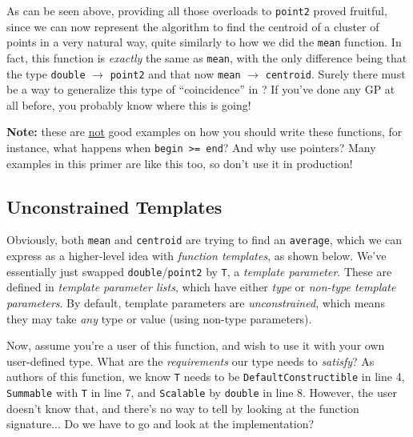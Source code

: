 



\noindent As can be seen above, providing all those overloads to \texttt{point2} proved fruitful, since we can now represent the algorithm to find the centroid of a cluster of points in a very natural way, quite similarly to how we did the \texttt{mean} function. In fact, this function is \emph{exactly} the same as \texttt{mean}, with the only difference being that the type \texttt{double} $\rightarrow$ \texttt{point2} and that now \texttt{mean} $\rightarrow$ \texttt{centroid}. Surely there must be a way to generalize this type of ``coincidence'' in \Cpp? If you've done any GP at all before, you probably know where this is going!

\vspace{1em}\noindent\textbf{Note:} these are \underline{not} good examples on how you should write these functions, for instance, what happens when \texttt{begin >= end}? And why use pointers? Many examples in this primer are like this too, so don't use it in production!

\subsection{Unconstrained Templates} \label{sec:unconstrained_templates}

    Obviously, both \texttt{mean} and \texttt{centroid} are trying to find an \texttt{average}, which we can express as a higher-level idea with \emph{function templates}, as shown below. We've essentially just swapped \texttt{double}/\texttt{point2} by \texttt{T}, a \emph{template parameter}. These are defined in \emph{template parameter lists}, which have either \emph{type} or \emph{non-type template parameters}. By default, template parameters are \emph{unconstrained}, which means they may take \emph{any} type or value (using non-type parameters).

    Now, assume you're a user of this function, and wish to use it with your own user-defined type. What are the \emph{requirements} our type needs to \emph{satisfy}? As authors of this function, we know \texttt{T} needs to be \texttt{DefaultConstructible} in line 4, \texttt{Summable} with \texttt{T} in line 7, and \texttt{Scalable} by \texttt{double} in line 8. However, the user doesn't know that, and there's no way to tell by looking at the function signature... Do we have to go and look at the implementation?

